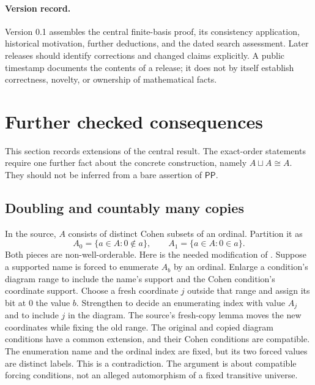 \documentclass[11pt,a4paper]{article}
\newcommand{\PP}{\mathsf{PP}}
\theoremstyle{definition}
\theoremstyle{remark}
\begin{document}
\paragraph{Version record.}
Version 0.1 assembles the central finite-basis proof, its consistency application, historical motivation, further deductions, and the dated search assessment. Later releases should identify corrections and changed claims explicitly. A public timestamp documents the contents of a release; it does not by itself establish correctness, novelty, or ownership of mathematical facts.

\clearpage
\appendix
\section{Further checked consequences}\label{lattice}

This section records extensions of the central result. The exact-order statements require one further fact about the concrete construction, namely $A\sqcup A\cong A$. They should not be inferred from a bare assertion of $\PP$.

\subsection{Doubling and countably many copies}
In the source, $A$ consists of distinct Cohen subsets of an ordinal. Partition it as
\[
 A_0=\{a\in A:0\notin a\},\qquad
 A_1=\{a\in A:0\in a\}.
\]
Both pieces are non-well-orderable. Here is the needed modification of \cite[Proposition 3.8]{OpenAI}. Suppose a supported name is forced to enumerate $A_b$ by an ordinal. Enlarge a condition's diagram range to include the name's support and the Cohen condition's coordinate support. Choose a fresh coordinate $j$ outside that range and assign its bit at $0$ the value $b$. Strengthen to decide an enumerating index with value $A_j$ and to include $j$ in the diagram. The source's fresh-copy lemma moves the new coordinates while fixing the old range. The original and copied diagram conditions have a common extension, and their Cohen conditions are compatible. The enumeration name and the ordinal index are fixed, but its two forced values are distinct labels. This is a contradiction. The argument is about compatible forcing conditions, not an alleged automorphism of a fixed transitive universe.
\end{document}
